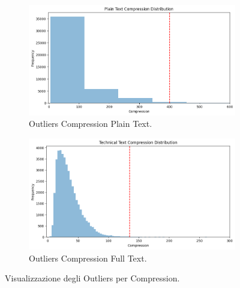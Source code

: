 \documentclass[12pt,a4paper,twoside,openright]{book}
\begin{document}
\begin{figure}
    \centering
    \begin{subfigure}[b]{0.85\textwidth}
        \includegraphics[width=\linewidth]{images/hist_compression_plain.png}
        \caption{Outliers Compression Plain Text.}
        \label{fig:hist_compression_plain}
    \end{subfigure}
\quad
    \begin{subfigure}[b]{0.85\textwidth}
        \includegraphics[width=\linewidth]{images/hist_compression_technical.png}
        \caption{Outliers Compression Full Text.}
        \label{fig:hist_compression_tech}
    \end{subfigure}
    \caption{Visualizzazione degli Outliers per Compression.}
\end{figure}
\end{document}

